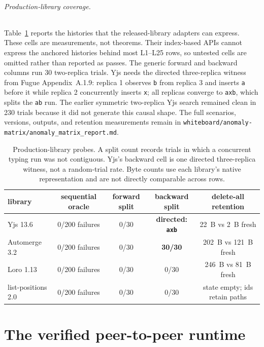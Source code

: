 \documentclass[11pt]{article}
\let\salInlinePart\part
\renewcommand{\part}{\clearpage\salInlinePart}
\newcommand{\code}[1]{\texttt{#1}}
\begin{document}
\clearpage

\paragraph{Production-library coverage.}
Table~\ref{tab:prodanomaly} reports the histories that the released-library
adapters can express. These cells are measurements, not theorems. Their
index-based APIs cannot express the anchored histories behind most L1--L25
rows, so untested cells are omitted rather than reported as passes. The generic
forward and backward columns run 30 two-replica trials. Yjs needs the directed
three-replica witness from Fugue Appendix~A.1.9: replica 1 observes \code{b}
from replica 3 and inserts \code{a} before it while replica 2 concurrently
inserts \code{x}; all replicas converge to \code{axb}, which splits the
\code{ab} run. The earlier symmetric two-replica Yjs search remained clean in
230 trials because it did not generate this causal shape. The full scenarios,
versions, outputs, and retention measurements remain in
\code{whiteboard/anomaly-matrix/anomaly\_matrix\_report.md}.

\begin{table}[h]
\centering
\scriptsize
\setlength{\tabcolsep}{4pt}
\begin{tabular}{@{}lcccc@{}}
\toprule
library & sequential oracle & forward split & backward split & delete-all retention \\
\midrule
Yjs 13.6 & 0/200 failures & 0/30 & \textbf{directed: \code{axb}} & 22~B vs 2~B fresh \\
Automerge 3.2 & 0/200 failures & 0/30 & \textbf{30/30} & 202~B vs 121~B fresh \\
Loro 1.13 & 0/200 failures & 0/30 & 0/30 & 246~B vs 81~B fresh \\
list-positions 2.0 & 0/200 failures & 0/30 & 0/30 & state empty; ids retain paths \\
\bottomrule
\end{tabular}
\caption{Production-library probes. A split count records trials in which a
concurrent typing run was not contiguous. Yjs's backward cell is one directed
three-replica witness, not a random-trial rate. Byte counts use each library's
native representation and are not directly comparable across rows.}
\label{tab:prodanomaly}
\end{table}

\part{The verified peer-to-peer runtime}
\end{document}
